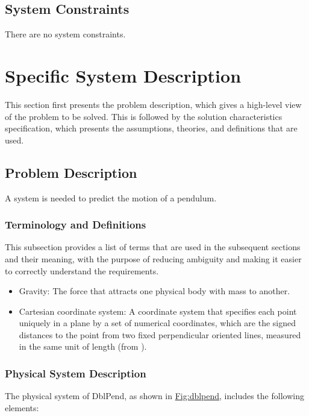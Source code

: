 \documentclass[12pt]{article}
\begin{document}
\subsection{System Constraints}
\label{Sec:SysConstraints}
There are no system constraints.

\section{Specific System Description}
\label{Sec:SpecSystDesc}
This section first presents the problem description, which gives a high-level view of the problem to be solved. This is followed by the solution characteristics specification, which presents the assumptions, theories, and definitions that are used.

\subsection{Problem Description}
\label{Sec:ProbDesc}
A system is needed to predict the motion of a pendulum.

\subsubsection{Terminology and Definitions}
\label{Sec:TermDefs}
This subsection provides a list of terms that are used in the subsequent sections and their meaning, with the purpose of reducing ambiguity and making it easier to correctly understand the requirements.

\begin{itemize}
\item{Gravity: The force that attracts one physical body with mass to another.}
\item{Cartesian coordinate system: A coordinate system that specifies each point uniquely in a plane by a set of numerical coordinates, which are the signed distances to the point from two fixed perpendicular oriented lines, measured in the same unit of length (from \cite{cartesianWiki}).}
\end{itemize}
\subsubsection{Physical System Description}
\label{Sec:PhysSyst}
The physical system of DblPend, as shown in \hyperref[Figure:dblpend]{Fig:dblpend}, includes the following elements:
\end{document}
